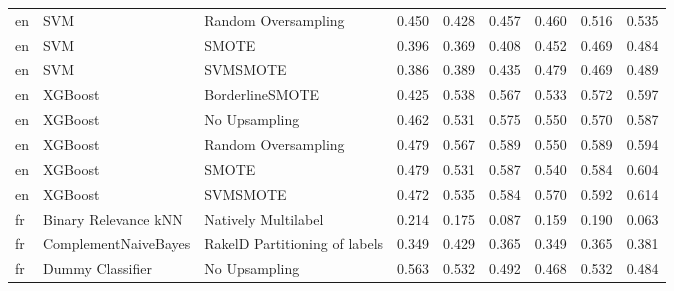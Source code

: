 \begin{tabular}{lllllllll}
      en &                             SVM &           Random Oversampling & 0.450 &                     0.428 &                 0.457 &                  0.460 &                                   0.516 &     0.535 \\
      en &                             SVM &                         SMOTE & 0.396 &                     0.369 &                 0.408 &                  0.452 &                                   0.469 &     0.484 \\
      en &                             SVM &                      SVMSMOTE & 0.386 &                     0.389 &                 0.435 &                  0.479 &                                   0.469 &     0.489 \\
      en &                         XGBoost &               BorderlineSMOTE & 0.425 &                     0.538 &                 0.567 &                  0.533 &                                   0.572 &     0.597 \\
      en &                         XGBoost &                 No Upsampling & 0.462 &                     0.531 &                 0.575 &                  0.550 &                                   0.570 &     0.587 \\
      en &                         XGBoost &           Random Oversampling & 0.479 &                     0.567 &                 0.589 &                  0.550 &                                   0.589 &     0.594 \\
      en &                         XGBoost &                         SMOTE & 0.479 &                     0.531 &                 0.587 &                  0.540 &                                   0.584 &     0.604 \\
      en &                         XGBoost &                      SVMSMOTE & 0.472 &                     0.535 &                 0.584 &                  0.570 &                                   0.592 &     0.614 \\
      fr &            Binary Relevance kNN &           Natively Multilabel & 0.214 &                     0.175 &                 0.087 &                  0.159 &                                   0.190 &     0.063 \\
      fr &            ComplementNaiveBayes & RakelD Partitioning of labels & 0.349 &                     0.429 &                 0.365 &                  0.349 &                                   0.365 &     0.381 \\
      fr &                Dummy Classifier &                 No Upsampling & 0.563 &                     0.532 &                 0.492 &                  0.468 &                                   0.532 &     0.484 \\

\end{tabular}
